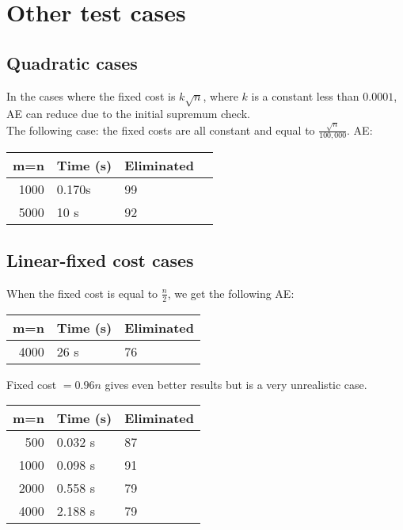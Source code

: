 \documentclass[11pt]{article}
\begin{document}
\section{Other test cases}
\subsection*{Quadratic cases}
In the cases where the fixed cost is $k\sqrt{n}$, where $k$ is a constant less than $0.0001$, AE can reduce due to the initial supremum check.\\
The following case: the fixed costs are all constant and equal to $\frac{\sqrt{n}}{100,000}$.
AE:
\begin{center}
\begin{tabular}{|r|l|l|l}
  \hline
  m=n & Time (s) & Eliminated \\ \hline
  1000 & 0.170s & 99\\ \hline
  5000 & 10 s & 92 \\ \hline
\end{tabular}
\end{center}

\subsection*{Linear-fixed cost cases}
When the fixed cost is equal to $\frac{n}{2}$, we get the following
AE:
\begin{center}
\begin{tabular}{|r|l|l|}
  \hline
  m=n & Time (s) & Eliminated \\ \hline
  4000 & 26 s & 76  \\ \hline
\end{tabular}
\end{center}
Fixed cost $= 0.96n$ gives even better results but is a very unrealistic case.
\begin{center}
\begin{tabular}{|r|l|l|}
  \hline
  m=n & Time (s) & Eliminated \\ \hline
  500 & 0.032 s & 87  \\ \hline
  1000 & 0.098 s & 91 \\ \hline
  2000 &  0.558 s & 79 \\ \hline
  4000 & 2.188 s & 79 \\ \hline
  \end{tabular}
\end{center}
\end{document}
